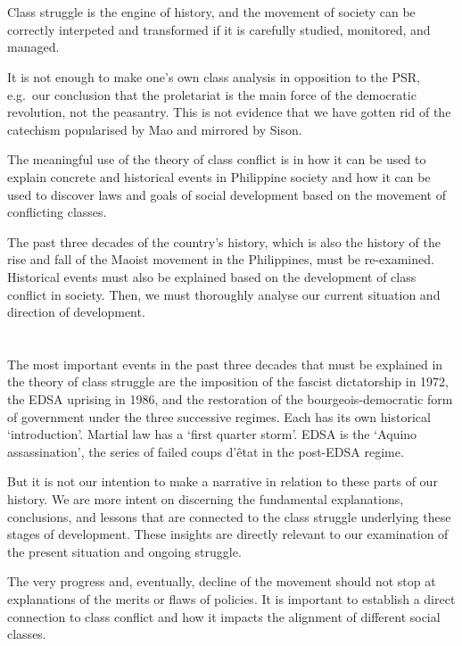 \section{}
Class struggle is the engine of history, and
the movement of society
can be correctly interpeted and transformed
if it is carefully studied, monitored, and managed.

It is not enough to make one's own class analysis in opposition to the PSR,
e.g.~our conclusion that the proletariat is 
the main force of the democratic revolution, not the peasantry. 
This is not evidence that we have gotten rid 
of the catechism popularised by Mao and mirrored by Sison.

The meaningful use of the theory of class conflict 
is in how it can be used to explain 
concrete and historical events 
in Philippine society 
and how it can be used to discover laws and goals 
of social development based on the movement of conflicting classes.

The past three decades of the country's history,
which is also the history of the rise and fall of 
the Maoist movement in the Philippines,
must be re-examined. 
Historical events must also be explained based on the development 
of class conflict in society. 
Then,  we must thoroughly analyse our current situation 
and direction of development.

\section{}
The most important events in the past three decades that must be explained 
in the theory of class struggle are 
the imposition of the fascist dictatorship in 1972, 
the EDSA uprising in 1986, 
and the restoration of the bourgeois-democratic form of government 
under the three successive regimes. 
Each has its own historical `introduction'. 
Martial law has a `first quarter storm'. 
EDSA is the `Aquino assassination', 
the series of failed coups d'êtat in the post-EDSA regime.

But it is not our intention to make a narrative in relation 
to these parts of our history. 
We are more intent on 
discerning the fundamental explanations, conclusions, and lessons 
that are connected to the class struggle 
underlying these stages of development. 
These insights are directly relevant 
to our examination of the present situation and ongoing struggle.

The very progress and, eventually, decline of the movement 
should not stop at explanations of 
the merits or flaws of policies. 
It is important to establish 
a direct connection to class conflict 
and how it impacts the alignment of different social classes.

